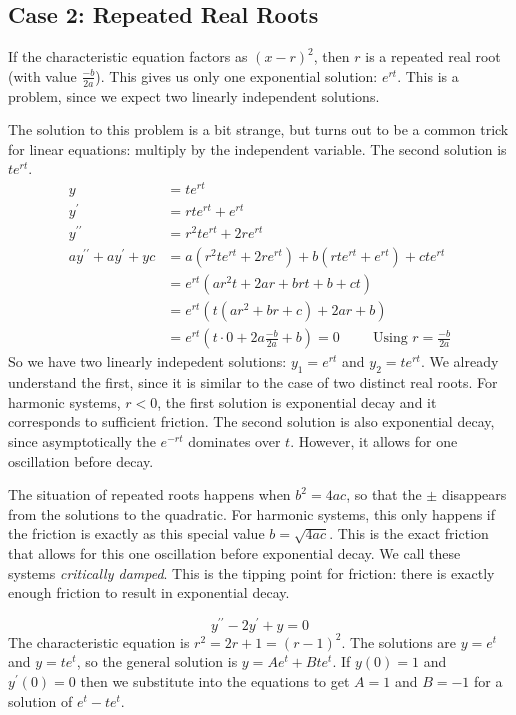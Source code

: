 \documentclass[fleqn,letterpaper]{report}
\begin{document}
\subsection{Case 2: Repeated Real Roots}
\label{repeated-real-root}

If the characteristic equation factors as $(x-r)^2$, then $r$
is a repeated real root (with value $\frac{-b}{2a}$). This
gives us only one exponential solution: $e^{rt}$. This is a
problem, since we expect two linearly independent solutions.

The solution to this problem is a bit strange, but turns out
to be a common trick for linear equations: multiply by the
independent variable. The second solution is
$te^{rt}$. 
\begin{align*}
y & = te^{rt} \\
y^\prime & = rte^{rt} + e^{rt} \\
y^{\prime\prime} & = r^2 t e^{rt} + 2re^{rt} \\
a y^{\prime\prime} + a y^\prime + yc & = a (r^2 t e^{rt} + 2
re^{rt}) + b (rte^{rt} + e^{rt} ) + cte^{rt} \\
& = e^{rt} (ar^2 t + 2ar + brt + b + ct ) \\
& = e^{rt} ( t(ar^2 + br + c) + 2ar + b) \\
& = e^{rt} ( t \cdot 0 + 2a \frac{-b}{2a} + b ) = 0
\hspace{1cm} \text{Using } r = \frac{-b}{2a}
\end{align*}
So we have two linearly indepedent solutions: $y_1 = e^{rt}$
and $y_2 = te^{rt}$. We already understand the first, since
it is similar to the case of two distinct real roots. For
harmonic systems, $r<0$, the first solution is
exponential decay and it corresponds to sufficient friction.
The second solution is also exponential decay, since
asymptotically the $e^{-rt}$ dominates over $t$. However, it
allows for one oscillation before decay. 

The situation of repeated roots happens when $b^2 = 4ac$, so
that the $\pm$ disappears from the solutions to the quadratic.
For harmonic systems, this only happens if the friction is
exactly as this special value $b = \sqrt{4ac}$. This is the
exact friction that allows for this one oscillation before
exponential decay. We call these systems \emph{critically
damped}. This is the tipping point for friction: there is
exactly enough friction to result in exponential decay.

\begin{example}
\begin{equation*}
y^{\prime\prime} -2y^\prime + y = 0
\end{equation*}
 The characteristic equation is $r^2 = 2r
+ 1 = (r-1)^2$. The solutions are $y = e^t$ and $y=te^t$, so
the general solution is $y= Ae^t + Bte^t$. If $y(0) = 1$ and
$y^\prime(0) = 0$ then we substitute into the equations to get
$A=1$ and $B=-1$ for a solution of $e^t - te^t$. 
\end{example}
\end{document}
